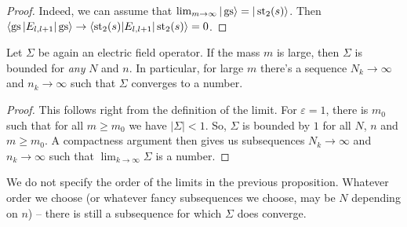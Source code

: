 \begin{proof}
Indeed, we can assume that $\lim_{m \rightarrow \infty} |\operatorname{gs}\rangle = |\operatorname{st}_2(s)\rangle$. Then $\langle \operatorname{gs} | E_{l,l+1} | \operatorname{gs} \rangle \rightarrow \langle \operatorname{st}_2(s) | E_{l,l+1}|\operatorname{st}_2(s)\rangle = 0$.
\end{proof}
\begin{corp}
Let $\Sigma$ be again an electric field operator. If the mass $m$ is large, then $\Sigma$ is bounded for \emph{any} $N$ and $n$. In particular, for large $m$ there's a sequence $N_k \rightarrow \infty$ and $n_k \rightarrow \infty$ such that $\Sigma$ converges to a number.
\end{corp}
\begin{proof}
This follows right from the definition of the limit. For $\varepsilon = 1$, there is $m_0$ such that for all $m \geq m_0$ we have $|\Sigma| < 1$. So, $\Sigma$ is bounded by $1$ for all $N$, $n$ and $m \geq m_0$. A compactness argument then gives us subsequences $N_k \rightarrow \infty$ and $n_k \rightarrow \infty$ such that $\lim_{k \rightarrow \infty} \Sigma$ is a number.
\end{proof}
We do not specify the order of the limits in the previous proposition. Whatever order we choose (or whatever fancy subsequences we choose, may be $N$ depending on $n$) -- there is still a subsequence for which $\Sigma$ does converge. 
	
